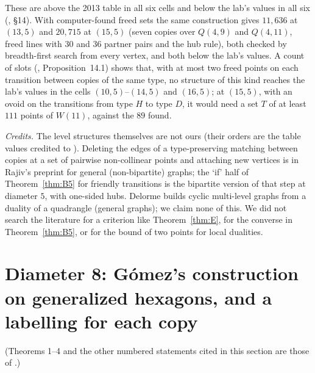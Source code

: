 \documentclass[11pt]{amsart}
\theoremstyle{definition}
\theoremstyle{remark}
\begin{document}
These are above the 2013 table in all six cells and below the lab's values in all six (, \S14). With computer-found freed sets the same construction gives $11{,}636$ at $(13,5)$ and $20{,}715$ at $(15,5)$ (seven copies over $Q(4,9)$ and $Q(4,11)$, freed lines with $30$ and $36$ partner pairs and the hub rule), both checked by breadth-first search from every vertex, and both below the lab's values. A count of slots (, Proposition~14.1) shows that, with at most two freed points on each transition between copies of the same type, no structure of this kind reaches the lab's values in the cells $(10,5)$--$(14,5)$ and $(16,5)$; at $(15,5)$, with an ovoid on the transitions from type $H$ to type $D$, it would need a set $T$ of at least $111$ points of $W(11)$, against the $89$ found.

\emph{Credits.} The level structures themselves are not ours (their orders are the table values credited to \cite{DGQ}). Deleting the edges of a type-preserving matching between copies at a set of pairwise non-collinear points and attaching new vertices is in Rajiv's preprint \cite{R26} for general (non-bipartite) graphs; the `if' half of Theorem~\ref{thm:B5} for friendly transitions is the bipartite version of that step at diameter $5$, with one-sided hubs. Delorme \cite[\S3]{D85a} builds cyclic multi-level graphs from a duality of a quadrangle (general graphs); we claim none of this. We did not search the literature for a criterion like Theorem~\ref{thm:E}, for the converse in Theorem~\ref{thm:B5}, or for the bound of two points for local dualities.

\section{Diameter 8: G\'omez's construction on generalized hexagons, and a labelling for each copy}\label{sec:d8}

(Theorems 1--4 and the other numbered statements cited in this section are those of .)
\end{document}
